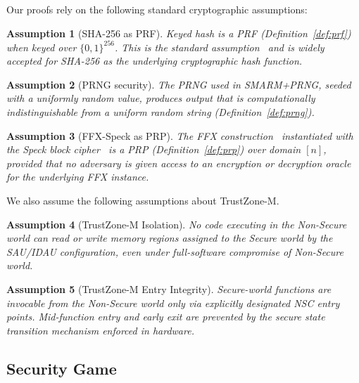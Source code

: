 \documentclass{ieeeaccess}
\newcommand{\rtsmarmone}{SMARM+PRNG\xspace}
\newtheorem{assumption}{Assumption}[section]
\begin{document}
Our proofs rely on the following standard cryptographic assumptions:
 
\begin{assumption}[SHA-256 as PRF]
\label{asm:sha256-prf}
Keyed hash is a PRF (Definition~\ref{def:prf})
when keyed over $\{0,1\}^{256}$.
This is the standard assumption~\cite{bellare1996new} and is
widely accepted for SHA-256 as the underlying cryptographic hash function.
\end{assumption}
 
\begin{assumption}[PRNG security]
\label{asm:prng}
The PRNG used in \rtsmarmone, seeded with a uniformly random value, produces
output that is computationally indistinguishable from a uniform random string
(Definition~\ref{def:prng}).
\end{assumption}
 
\begin{assumption}[FFX-Speck as PRP]
\label{asm:ffx-prp}
The FFX construction~\cite{bellare2010ffx} instantiated with the Speck block
cipher~\cite{speck} is a PRP (Definition~\ref{def:prp}) over
domain $[n]$, provided that no adversary is given access to an
encryption or decryption oracle for the underlying FFX instance.
\end{assumption}

We also assume the following assumptions about TrustZone-M.
 
\begin{assumption}[TrustZone-M Isolation]
\label{asm:tz-isolation}
No code executing in the Non-Secure world can read or write memory
regions assigned to the Secure world by the SAU/IDAU configuration,
even under full-software compromise of Non-Secure world.
\end{assumption}
 
\begin{assumption}[TrustZone-M Entry Integrity]
\label{asm:tz-entry}
Secure-world functions are invocable from the Non-Secure world only via
explicitly designated NSC entry points.
Mid-function entry and early exit are prevented by the secure state transition mechanism enforced in hardware.
\end{assumption}
 
 
\subsection{Security Game}
\label{sec:game}
 
\end{document}
